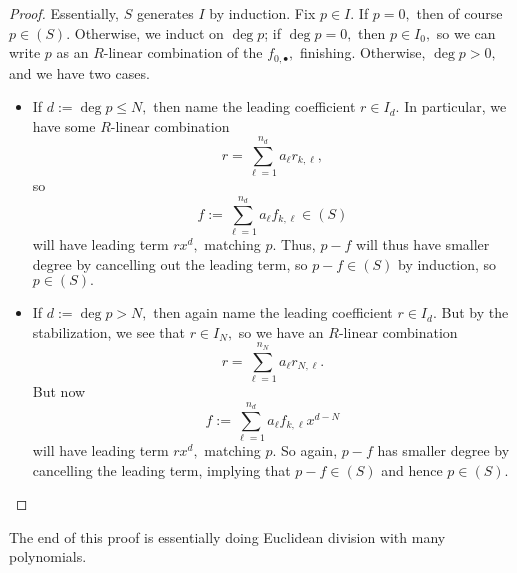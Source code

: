 \begin{proof}
	Essentially, $S$ generates $I$ by induction. Fix $p\in I.$ If $p=0,$ then of course $p\in(S).$ Otherwise, we induct on $\deg p$; if $\deg p=0,$ then $p\in I_0,$ so we can write $p$ as an $R$-linear combination of the $f_{0,\bullet},$ finishing. Otherwise, $\deg p>0,$ and we have two cases.
	\begin{itemize}
		\item If $d:=\deg p\le N,$ then name the leading coefficient $r\in I_d.$ In particular, we have some $R$-linear combination
		\[r=\sum_{\ell=1}^{n_d}a_\ell r_{k,\ell},\]
		so
		\[f:=\sum_{\ell=1}^{n_d}a_\ell f_{k,\ell}\in(S)\]
		will have leading term $rx^d,$ matching $p.$ Thus, $p-f$ will thus have smaller degree by cancelling out the leading term, so $p-f\in(S)$ by induction, so $p\in(S).$
		\item If $d:=\deg p>N,$ then again name the leading coefficient $r\in I_d.$ But by the stabilization, we see that $r\in I_N,$ so we have an $R$-linear combination
		\[r=\sum_{\ell=1}^{n_N}a_\ell r_{N,\ell}.\]
		But now
		\[f:=\sum_{\ell=1}^{n_d}a_\ell f_{k,\ell}x^{d-N}\]
		will have leading term $rx^d,$ matching $p.$ So again, $p-f$ has smaller degree by cancelling the leading term, implying that $p-f\in (S)$ and hence $p\in(S).$
		\qedhere
	\end{itemize}
\end{proof}
\begin{remark}[Nir]
	The end of this proof is essentially doing Euclidean division with many polynomials.
\end{remark}

